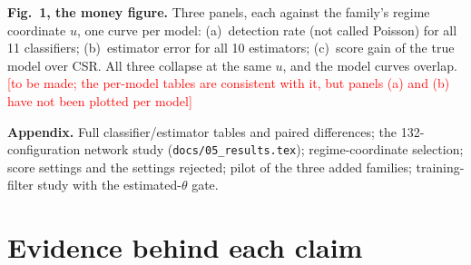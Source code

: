 \documentclass[11pt]{article}
\newcommand{\pending}[1]{\textcolor{red}{[#1]}}
\newcommand{\src}[1]{{\footnotesize\texttt{#1}}}
\begin{document}
\textbf{Fig.~1, the money figure.} Three panels, each against the family's regime coordinate $u$, one curve per
model: (a)~detection rate (not called Poisson) for all 11 classifiers; (b)~estimator error for all 10 estimators;
(c)~score gain of the true model over CSR. All three collapse at the same $u$, and the model curves overlap.
\pending{to be made; the per-model tables are consistent with it, but panels (a) and (b) have not been plotted per model}

\textbf{Appendix.} Full classifier/estimator tables and paired differences; the 132-configuration network study
(\src{docs/05\_results.tex}); regime-coordinate selection; score settings and the settings rejected; pilot of the three
added families; training-filter study with the estimated-$\theta$ gate.

\section*{Evidence behind each claim}
\end{document}
